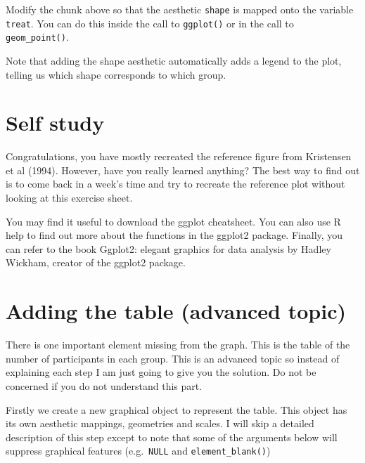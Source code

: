 \documentclass[
]{book}
\begin{document}
Modify the chunk above so that the aesthetic \texttt{shape} is mapped onto the variable \texttt{treat}. You can do this inside the call to \texttt{ggplot()} or in the call to \texttt{geom\_point()}.

Note that adding the shape aesthetic automatically adds a legend to the plot, telling us which shape corresponds to which group.

\section{Self study}\label{self-study}

Congratulations, you have mostly recreated the reference figure from Kristensen et al (1994). However, have you really learned anything? The best way to find out is to come back in a week's time and try to recreate the reference plot without looking at this exercise sheet.

You may find it useful to download the ggplot cheatsheet. You can also use R help to find out more about the functions in the ggplot2 package. Finally, you can refer to the book Ggplot2: elegant graphics for data analysis by Hadley Wickham, creator of the ggplot2 package.

\section{Adding the table (advanced topic)}\label{adding-the-table-advanced-topic}

There is one important element missing from the graph. This is the table of the number of participants in each group. This is an advanced topic so instead of explaining each step I am just going to give you the solution. Do not be concerned if you do not understand this part.

Firstly we create a new graphical object to represent the table. This object has its own aesthetic mappings, geometries and scales. I will skip a detailed description of this step except to note that some of the arguments below will suppress graphical features (e.g.~\texttt{NULL} and \texttt{element\_blank()})
\end{document}
